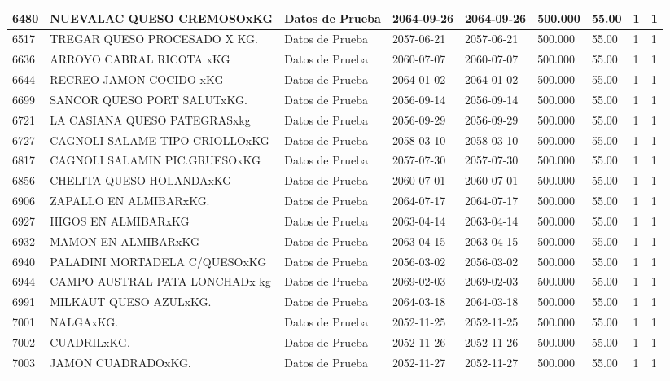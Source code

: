 \documentclass[a4paper,12pt]{article}
\begin{document}
\begin{landscape}
\begin{longtable}{|p{4cm}|p{2.5cm}|p{2.5cm}|p{1.8cm}|p{1.8cm}|p{1cm}|p{1cm}|p{3cm}|p{3cm}||}
6480 & NUEVALAC QUESO CREMOSOxKG & Datos de Prueba & 2064-09-26 & 2064-09-26 & 500.000 & 55.00 & 1 & 1 \\ \hline 
6517 & TREGAR QUESO PROCESADO X KG. & Datos de Prueba & 2057-06-21 & 2057-06-21 & 500.000 & 55.00 & 1 & 1 \\ \hline 
6636 & ARROYO CABRAL RICOTA xKG & Datos de Prueba & 2060-07-07 & 2060-07-07 & 500.000 & 55.00 & 1 & 1 \\ \hline 
6644 & RECREO JAMON COCIDO xKG & Datos de Prueba & 2064-01-02 & 2064-01-02 & 500.000 & 55.00 & 1 & 1 \\ \hline 
6699 & SANCOR QUESO PORT SALUTxKG. & Datos de Prueba & 2056-09-14 & 2056-09-14 & 500.000 & 55.00 & 1 & 1 \\ \hline 
6721 & LA CASIANA QUESO PATEGRASxkg & Datos de Prueba & 2056-09-29 & 2056-09-29 & 500.000 & 55.00 & 1 & 1 \\ \hline 
6727 & CAGNOLI SALAME TIPO CRIOLLOxKG & Datos de Prueba & 2058-03-10 & 2058-03-10 & 500.000 & 55.00 & 1 & 1 \\ \hline 
6817 & CAGNOLI SALAMIN PIC.GRUESOxKG & Datos de Prueba & 2057-07-30 & 2057-07-30 & 500.000 & 55.00 & 1 & 1 \\ \hline 
6856 & CHELITA QUESO HOLANDAxKG & Datos de Prueba & 2060-07-01 & 2060-07-01 & 500.000 & 55.00 & 1 & 1 \\ \hline 
6906 & ZAPALLO EN ALMIBARxKG. & Datos de Prueba & 2064-07-17 & 2064-07-17 & 500.000 & 55.00 & 1 & 1 \\ \hline 
6927 & HIGOS EN ALMIBARxKG & Datos de Prueba & 2063-04-14 & 2063-04-14 & 500.000 & 55.00 & 1 & 1 \\ \hline 
6932 & MAMON EN ALMIBARxKG & Datos de Prueba & 2063-04-15 & 2063-04-15 & 500.000 & 55.00 & 1 & 1 \\ \hline 
6940 & PALADINI MORTADELA C/QUESOxKG & Datos de Prueba & 2056-03-02 & 2056-03-02 & 500.000 & 55.00 & 1 & 1 \\ \hline 
6944 & CAMPO AUSTRAL PATA LONCHADx kg & Datos de Prueba & 2069-02-03 & 2069-02-03 & 500.000 & 55.00 & 1 & 1 \\ \hline 
6991 & MILKAUT QUESO AZULxKG. & Datos de Prueba & 2064-03-18 & 2064-03-18 & 500.000 & 55.00 & 1 & 1 \\ \hline 
7001 & NALGAxKG. & Datos de Prueba & 2052-11-25 & 2052-11-25 & 500.000 & 55.00 & 1 & 1 \\ \hline 
7002 & CUADRILxKG. & Datos de Prueba & 2052-11-26 & 2052-11-26 & 500.000 & 55.00 & 1 & 1 \\ \hline 
7003 & JAMON CUADRADOxKG. & Datos de Prueba & 2052-11-27 & 2052-11-27 & 500.000 & 55.00 & 1 & 1 \\ \hline 

\end{longtable}
\end{landscape}
\end{document}
